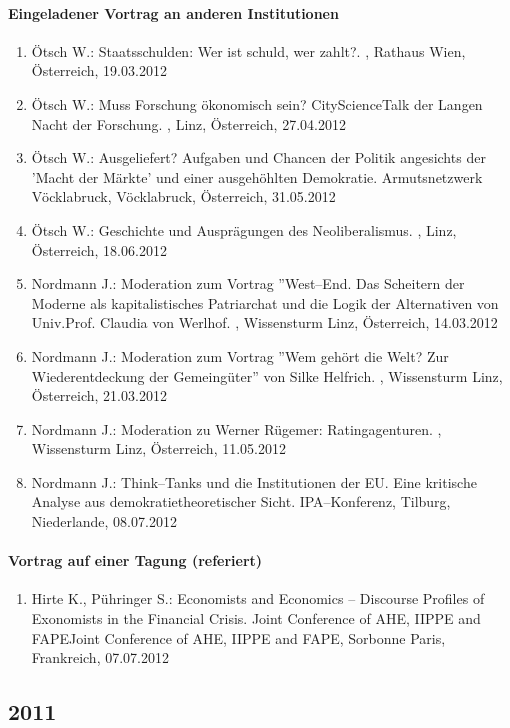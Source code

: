 \paragraph{Eingeladener Vortrag an anderen Institutionen}
\begin{enumerate}
	\item Ötsch W.: Staatsschulden: Wer ist schuld, wer zahlt?. , Rathaus Wien, Österreich, 19.03.2012
	\item Ötsch W.: Muss Forschung ökonomisch sein? CityScienceTalk der Langen Nacht der Forschung. , Linz, Österreich, 27.04.2012
	\item Ötsch W.: Ausgeliefert? Aufgaben und Chancen der Politik angesichts der 'Macht der Märkte' und einer ausgehöhlten Demokratie. Armutsnetzwerk Vöcklabruck, Vöcklabruck, Österreich, 31.05.2012
	\item Ötsch W.: Geschichte und Ausprägungen des Neoliberalismus. , Linz, Österreich, 18.06.2012
	\item Nordmann J.: Moderation zum Vortrag ''West--End. Das Scheitern der Moderne als kapitalistisches Patriarchat und die Logik der Alternativen von Univ.Prof. Claudia von Werlhof. , Wissensturm Linz, Österreich, 14.03.2012
	\item Nordmann J.: Moderation zum Vortrag ''Wem gehört die Welt? Zur Wiederentdeckung der Gemeingüter'' von Silke Helfrich. , Wissensturm Linz, Österreich, 21.03.2012
	\item Nordmann J.: Moderation zu Werner Rügemer: Ratingagenturen. , Wissensturm Linz, Österreich, 11.05.2012
	\item Nordmann J.: Think--Tanks und die Institutionen der EU. Eine kritische Analyse aus demokratietheoretischer Sicht. IPA--Konferenz, Tilburg, Niederlande, 08.07.2012
\end{enumerate}
\paragraph{Vortrag auf einer Tagung (referiert)}
\begin{enumerate}
	\item Hirte K., Pühringer S.: Economists and Economics -- Discourse Profiles of Exonomists in the Financial Crisis. Joint Conference of AHE, IIPPE and FAPEJoint Conference of AHE, IIPPE and FAPE, Sorbonne Paris, Frankreich, 07.07.2012
\end{enumerate}
\subsection*{2011}
